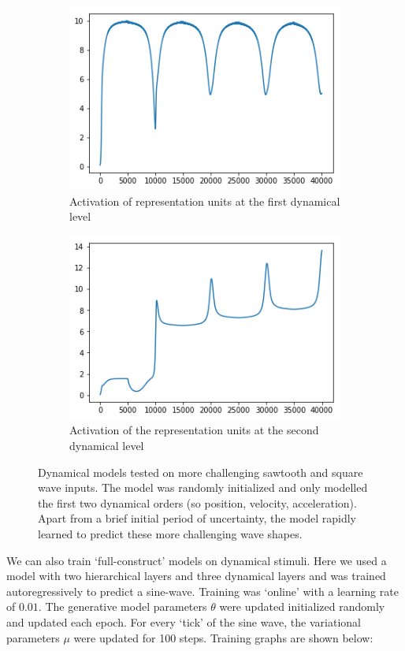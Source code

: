 \begin{figure}[H]
\bigskip
\begin{subfigure}{.32\linewidth}
 \centering
 \includegraphics[width=0.8\linewidth]{chapter_3_figures/sawtooth_mu1.png}
 \caption{Activation of representation units at the first dynamical level}
\end{subfigure}
 \hfill
\begin{subfigure}{.32\linewidth}
 \centering
 \includegraphics[width=0.8\linewidth]{chapter_3_figures/sawtooth_mu2.png}
 \caption{Activation of the representation units at the second dynamical level}
\end{subfigure}
\caption{Dynamical models tested on more challenging sawtooth and square wave inputs. The model was randomly initialized and only modelled the first two dynamical orders (so position, velocity, acceleration). Apart from a brief initial period of uncertainty, the model rapidly learned to predict these more challenging wave shapes.}
\end{figure}


We can also train `full-construct' models on dynamical stimuli. Here we used a model with two hierarchical layers and three dynamical layers and was trained autoregressively to predict a sine-wave. Training was `online' with a learning rate of $0.01$. The generative model parameters $\theta$ were updated initialized randomly and updated each epoch. For every `tick' of the sine wave, the variational parameters $\mu$ were updated for 100 steps. Training graphs are shown below:

